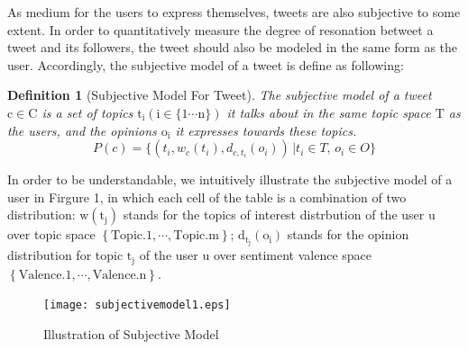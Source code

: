 \documentclass{acm_proc_article-sp}
\newtheorem{definition}{Definition}
\begin{document}
As medium for the users to express themselves, tweets are also subjective to some extent. In order to quantitatively measure the degree of resonation betweet a tweet and its followers, the tweet should also be modeled in the same form as the user. Accordingly, the subjective model of a tweet is define as following:
\begin{definition}[Subjective Model For Tweet]
The subjective model of a tweet $\mathrm{c \in C}$ is a set of topics $\mathrm{t_{i} \left( i \in \lbrace1 \cdots n \rbrace \right) }$ it talks about in the same topic space $\mathrm{T}$ as the users, and the opinions $\mathrm{o_{i}}$ it expresses towards these topics.
\begin{equation}
P \left( c \right) = \lbrace \left( t_{i}, w_{c} \left( t_{i} \right), d_{c,t_{i}} \left( o_{i} \right) \right) \,\vert  t_{i} \in T, \, o_{i} \in O \rbrace
\end{equation}
\end{definition}
In order to be understandable, we intuitively illustrate the subjective model of a user in Firgure 1, in which each cell of the table is a combination of two distribution: $ \mathrm{w \left( t_{j}\right)}  $ stands for the topics of interest distrbution of the user $ \mathrm{u} $ over topic space $ \mathrm{\left\lbrace Topic.1, \cdots, Topic.m \right\rbrace}  $; $ \mathrm{d_{t_{j}} \left( o_{i} \right) } $ stands for the opinion distribution for topic $ \mathrm{t_{j}} $ of the user $ \mathrm{u} $  over sentiment valence space $ \mathrm{\left\lbrace Valence.1, \cdots, Valence.n \right\rbrace}  $.
\begin{figure}
\centering
\texttt{[image: subjectivemodel1.eps]}
\caption{Illustration of Subjective Model}
\label{fig:graph1}
\end{figure}
\end{document}
